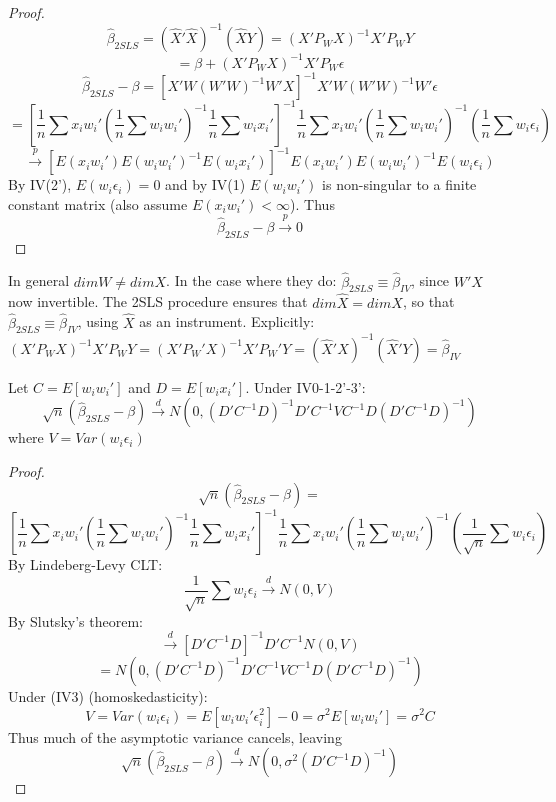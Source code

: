 \documentclass[DIV=14,titlepage=false]{scrreprt}
\begin{document}
\begin{proof}
\[\hat{\beta}_{2SLS}=(\hat X'\hat X)^{-1}(\hat X Y)=(X'P_WX)^{-1}X'P_WY\]
\[=\beta+(X'P_WX)^{-1}X'P_W\epsilon\]
\[\hat{\beta}_{2SLS}-\beta=[X'W (W'W)^{-1}W'X]^{-1}X'W(W'W)^{-1}W'\epsilon\]
\[=\left[\frac{1}{n}\sum x_iw_i'(\frac{1}{n}\sum w_iw_i')^{-1}\frac{1}{n}\sum w_ix_i'\right]^{-1}\frac{1}{n}\sum x_iw_i'(\frac{1}{n}\sum w_iw_i')^{-1}(\frac{1}{n}\sum w_i\epsilon_i)\]
\[\xrightarrow{p} [E(x_iw_i')E(w_iw_i')^{-1}E(w_ix_i')]^{-1}E(x_iw_i')E(w_iw_i')^{-1}E(w_i\epsilon_i)\]
By IV(2'), \(E(w_i\epsilon_i)=0\) and by IV(1) \(E(w_iw_i')\) is non-singular to a finite constant matrix (also assume \(E(x_iw_i') <\infty\)).
Thus \[\hat\beta_{2SLS}-\beta\xrightarrow{p}0\]
\end{proof}

In general \(dim W\neq dim X\). In the case where they do: \(\hat\beta_{2SLS}\equiv\hat\beta_{IV}\), since \(W'X\) now invertible.
The 2SLS procedure ensures that \(dim \hat X=dimX\), so that \(\hat\beta_{2SLS}\equiv\hat\beta_{IV}\), using \(\hat X\) as an instrument.
Explicitly: \((X'P_WX)^{-1}X'P_WY=(X'P_W'X)^{-1}X'P_W'Y=(\hat X'X)^{-1}(\hat X'Y)=\hat\beta_{IV}\)

\begin{theorem}
    Let \(C=E[w_iw_i']\) and \(D=E[w_ix_i']\). Under IV0-1-2'-3':
    \[\sqrt{n}(\hat\beta_{2SLS}-\beta)\xrightarrow{d}N(0,(D'C^{-1}D)^{-1}D'C^{-1}VC^{-1}D(D'C^{-1}D)^{-1})\]
    where \(V=Var(w_i\epsilon_i)\)
\end{theorem}
\vspace{5mm}
\begin{proof}
\[\sqrt{n}(\hat\beta_{2SLS}-\beta)=\]
\[\left[\frac{1}{n}\sum x_iw_i'(\frac{1}{n}\sum w_iw_i')^{-1}\frac{1}{n}\sum w_ix_i'\right]^{-1}\frac{1}{n}\sum x_iw_i'(\frac{1}{n}\sum w_iw_i')^{-1}(\frac{1}{\sqrt{n}}\sum w_i\epsilon_i)\]
By Lindeberg-Levy CLT:
\[\frac{1}{\sqrt{n}}\sum w_i\epsilon_i\xrightarrow{d}N(0,V)\]
By Slutsky's theorem:
\[\xrightarrow{d} [D'C^{-1}D]^{-1}D'C^{-1}N(0,V)\]
\[= N(0,(D'C^{-1}D)^{-1}D'C^{-1}VC^{-1}D(D'C^{-1}D)^{-1})\]
Under (IV3) (homoskedasticity):
\[V=Var(w_i\epsilon_i)=E[w_iw_i'\epsilon_i^2]-0=\sigma^2E[w_iw_i']=\sigma^2C\]
Thus much of the asymptotic variance cancels, leaving
\[\sqrt{n}(\hat\beta_{2SLS}-\beta)\xrightarrow{d}N(0,\sigma^2(D'C^{-1}D)^{-1})\]
\end{proof}
\end{document}
